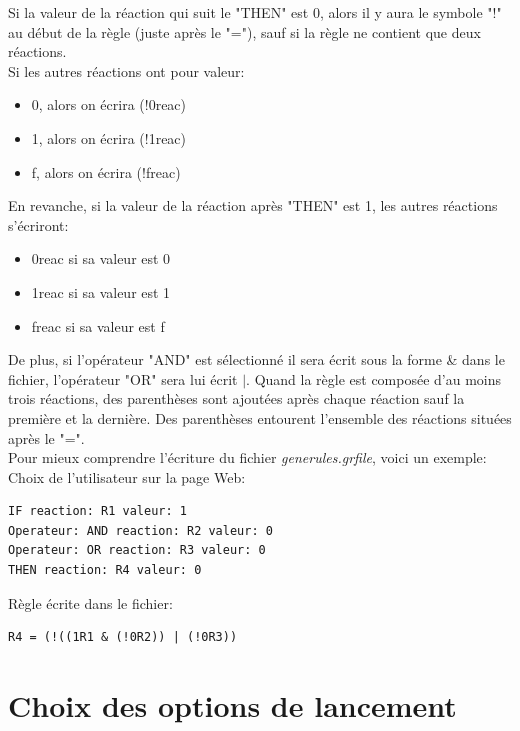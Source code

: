 Si la valeur de la réaction qui suit le "THEN" est 0, alors il y aura le symbole "!" au début de la règle (juste après le "="), sauf si la règle ne contient que deux réactions.\\
Si les autres réactions ont pour valeur:
\begin{itemize}
\item 0, alors on écrira (!0reac)
\item 1, alors on écrira (!1reac)
\item f, alors on écrira (!freac)
\end{itemize}
En revanche, si la valeur de la réaction après "THEN" est 1, les autres réactions s'écriront:
\begin{itemize}
\item 0reac si sa valeur est 0
\item 1reac si sa valeur est 1
\item freac si sa valeur est f
\end{itemize}
De plus, si l'opérateur "AND" est sélectionné il sera écrit sous la forme \& dans le fichier, l'opérateur "OR" sera lui écrit $|$. Quand la règle est composée d'au moins trois réactions, des parenthèses sont ajoutées après chaque réaction sauf la première et la dernière. Des parenthèses entourent l'ensemble des réactions situées après le "=".\\

Pour mieux comprendre l'écriture du fichier \emph{generules.grfile}, voici un exemple:\\

Choix de l'utilisateur sur la page Web: \\
\begin{DDbox}{\linewidth}
\begin{lstlisting}
IF reaction: R1 valeur: 1
Operateur: AND reaction: R2 valeur: 0
Operateur: OR reaction: R3 valeur: 0
THEN reaction: R4 valeur: 0
\end{lstlisting}
\end{DDbox}

Règle écrite dans le fichier: \\
\begin{DDbox}{\linewidth}
\begin{lstlisting}
R4 = (!((1R1 & (!0R2)) | (!0R3))
\end{lstlisting}
\end{DDbox}

\section{Choix des options de lancement}

